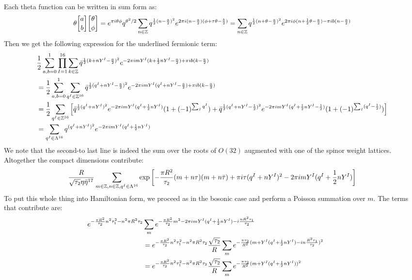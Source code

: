 \documentclass[11pt, class=article, crop=false]{standalone}
\begin{document}
\begin{enumerate}
		Each theta function can be written in sum form as: 
		\[
			\theta \twist ab \twist \theta \phi = e^{\pi i \theta \phi} q^{\theta^2/2} \sum_{n\in \ZZ} q^{\frac12 (n- \frac a2)^2} e^{2\pi i (n- \frac a2) (\phi + \tau \theta - \frac b2)} = \sum_{n \in \ZZ} q^{\frac12 (n + \theta - \frac a2)^2} e^{2\pi i  \phi (n + \frac12 \theta - \frac a2) - \pi i b (n- \frac a2)}
		\]
		Then we get the following expression for the underlined fermionic term: 
		\[
		\begin{aligned}
			&\frac12 \sum_{a,b=0}^1 \prod_{I = 1}^{16} \sum_{k\in \mathbb{Z}} \bar q^{\frac12 (k + n Y^I - \frac a2)^2} e^{-2\pi i m Y^I  (k + \frac12 n Y^I - \frac a2) + \pi i b (k- \frac a2)} \\
			&= \frac12 \sum_{a,b=0}^1
			 \sum_{q^I \in \mathbb{Z}^{16}} \bar q^{\frac12 (q^I + n Y^I - \frac a2)^2} e^{-2\pi i m Y^I  (q^I + n Y^I - \frac a2) + \pi i b (k- \frac a2)} \\
			&= \frac12 \sum_{q^I \in \mathbb{Z}^{16}} \left[ \bar q^{\frac12 (q^I + n Y^I)^2} e^{-2\pi i m Y^I  (q^I + \frac12 n Y^I) } (1 + (-1)^{\sum_I q^I})
			+ \bar q^{\frac12 (q^I + n Y^I- \frac12)^2} e^{-2\pi i m Y^I  (q^I + \frac12 n Y^I - \frac12) } (1 + (-1)^{\sum_I (q^I - \frac12)}) \right]\\
			&= \sum_{q^I \in \Lambda^{16}} q^{(q^I + n Y^I)^2} e^{-2 \pi i m Y^I (q^I + \frac12 n Y^I)}
		\end{aligned}
		\]
		We note that the second-to last line is indeed the sum over the roots of $O(32)$ augmented with one of the spinor weight lattices. Altogether the compact dimensions contribute:
		\[
			\frac{R}{\sqrt{\tau_2} \eta \bar \eta^{17}} \sum_{m\in \mathbb{Z},n \in \mathbb{Z} ,q^I \in \Lambda^{16}} \exp\left[-\frac{\pi R^2}{\tau_2} (m + n \tau) (m + n \bar \tau) + \pi i \tau (q^I + n Y^I)^2 - 2 \pi i m Y^I (q^I + \frac12 n Y^I) \right]
		\]
		To put this whole thing into Hamiltonian form, we proceed as in the bosonic case and perform a Poisson summation over $m$. The terms that contribute are:
		\[
		\hspace{-.3in}
		\begin{aligned}
			e^{-\frac{\pi R^2}{\tau_2} n^2 \tau_1^2 - n^2 \pi R^2 \tau_2}&\sum_{m} e^{-\frac{\pi R^2}{\tau_2} m^2 - 2\pi i m Y^I (q^I + \frac12 n Y^I)- i\frac{n R^2 \tau_1}{\tau_2}} \\
			&= e^{-\frac{\pi R^2}{\tau_2} n^2 \tau_1^2 - n^2 \pi R^2 \tau_2}\frac{\sqrt{\tau_2}}{R} \sum_{m} e^{-\frac{\pi \tau_2}{R^2} (m + Y^I (q^I + \frac12 n Y^I) - i n \frac{R^2 \tau_1}{\tau_2} )^2}\\
			&= e^{-\frac{\pi R^2}{\tau_2} n^2 \tau_1^2 - n^2 \pi R^2 \tau_2} \frac{\sqrt{\tau_2}}{R} \sum_{m} e^{-\frac{\pi \tau_2}{R^2} (m + Y^I (q^I + \frac12 n Y^I) )^2 
}
\end{aligned}\]
\end{enumerate}
\end{document}
